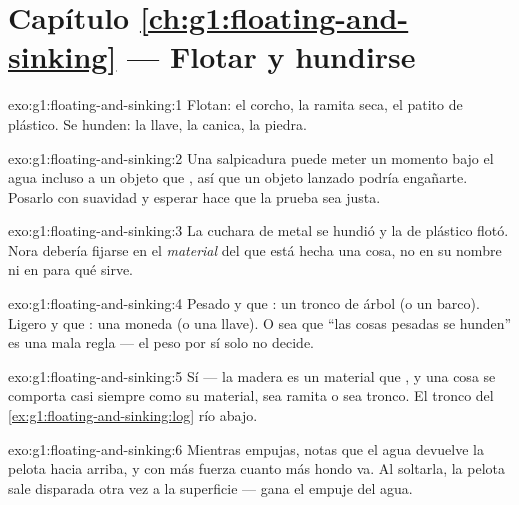 \section*{Capítulo \ref{ch:g1:floating-and-sinking} --- Flotar y hundirse}

\begin{solution}{exo:g1:floating-and-sinking:1}
Flotan: el corcho, la ramita seca, el patito de plástico. Se hunden:
la llave, la canica, la piedra.
\end{solution}

\begin{solution}{exo:g1:floating-and-sinking:2}
Una salpicadura puede meter un momento bajo el agua incluso a un
objeto que , así que un objeto lanzado podría engañarte. Posarlo
con suavidad y esperar hace que la prueba sea justa.
\end{solution}

\begin{solution}{exo:g1:floating-and-sinking:3}
La cuchara de metal se hundió y la de plástico flotó. Nora debería
fijarse en el \emph{material} del que está hecha una cosa, no en su
nombre ni en para qué sirve.
\end{solution}

\begin{solution}{exo:g1:floating-and-sinking:4}
Pesado y que : un tronco de árbol (o un barco). Ligero y que : una moneda (o una llave). O sea que ``las cosas pesadas
se hunden'' es una mala regla --- el peso por sí solo no decide.
\end{solution}

\begin{solution}{exo:g1:floating-and-sinking:5}
Sí --- la madera es un material que , y una cosa se comporta casi
siempre como su material, sea ramita o sea tronco. El tronco del
\cref{ex:g1:floating-and-sinking:log}  río abajo.
\end{solution}

\begin{solution}{exo:g1:floating-and-sinking:6}
Mientras empujas, notas que el agua devuelve la pelota hacia arriba, y
con más fuerza cuanto más hondo va. Al soltarla, la pelota sale
disparada otra vez a la superficie --- gana el empuje del agua.
\end{solution}


